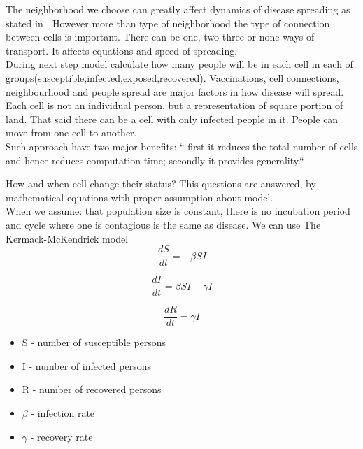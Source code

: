 \documentclass[a4paper, 11pt]{article}
\begin{document}
	The neighborhood we choose can greatly affect dynamics of disease spreading as stated in \cite{cisse}. However more than type of neighborhood the type of connection between cells is important. There can be one, two three or none ways of transport. It affects equations and speed of spreading.\cite{WHITE} \\

		During next step model calculate how many people will be in each cell in each of groups(susceptible,infected,exposed,recovered). Vaccinations, cell connections, neighbourhood and people spread are major factors in how disease will spread.\\	
	
	Each cell is not an individual person, but a representation of square portion of land. That said there can be a cell with only infected people in it. People can move from one cell to another.\cite{WHITE}  \\ Such approach have two major benefits: ``  first it reduces the total number of cells and hence reduces computation time; secondly it provides generality.``\cite{shih}
	


	How and when cell change their status? This questions are answered, by mathematical equations with proper assumption about model.\\
	When we assume: that population size is constant, there is no incubation period and cycle where one is contagious is the same as disease.  We can use The Kermack-McKendrick model\cite{report} \\
	\begin{equation}
	\frac{dS}{dt}=-\beta SI
	\end{equation}
	
	\begin{equation}
	\frac{dI}{dt}=\beta SI-\gamma I
	\end{equation}
	
	\begin{equation}
	\frac{dR}{dt}=\gamma I
	\end{equation}
	\begin{itemize}
		\item S - number of susceptible persons
		\item I - number of infected persons
		\item R - number of recovered persons
		\item $\beta$ - infection rate
		\item $\gamma$ - recovery rate
	\end{itemize}
	
\end{document}
